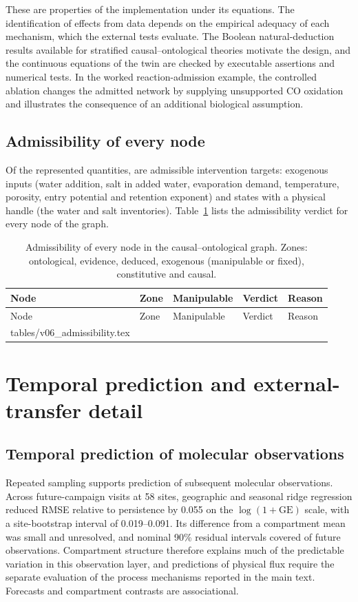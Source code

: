 \documentclass[11pt,a4paper]{article}
\makeatletter
\newcommand{\AdmissibilityRows}{\@@input tables/v06_admissibility.tex }
\makeatother
\begin{document}
These are properties of the implementation under its equations. The identification of effects from data depends on the empirical adequacy of each mechanism, which the external tests evaluate. The Boolean natural-deduction results available for stratified causal--ontological theories motivate the design, and the continuous equations of the twin are checked by executable assertions and numerical tests. In the worked reaction-admission example, the controlled ablation changes the admitted network by supplying unsupported CO oxidation and illustrates the consequence of an additional biological assumption.

\subsection{Admissibility of every node}
Of the \GraphNodes{} represented quantities, \AdmissibleNodes{} are admissible intervention targets: \AdmissibleInputs{} exogenous inputs (water addition, salt in added water, evaporation demand, temperature, porosity, entry potential and retention exponent) and \AdmissibleStates{} states with a physical handle (the water and salt inventories). Table~\ref{tab:admissibility} lists the admissibility verdict for every node of the graph.

{\small\setlength{\tabcolsep}{3pt}\begin{longtable}{@{}lp{2.8cm}lp{1.3cm}p{6.2cm}@{}}
\caption{Admissibility of every node in the causal--ontological graph. Zones: ontological, evidence, deduced, exogenous (manipulable or fixed), constitutive and causal.}\label{tab:admissibility}\\\toprule
Node & Zone & Manipulable & Verdict & Reason\\\midrule\endfirsthead
\toprule Node & Zone & Manipulable & Verdict & Reason\\\midrule\endhead
\AdmissibilityRows
\bottomrule
\end{longtable}}

\section{Temporal prediction and external-transfer detail}\label{sec:transfer}
\subsection{Temporal prediction of molecular observations}
Repeated sampling supports prediction of subsequent molecular observations. Across \TestVisits{} future-campaign visits at 58 sites, geographic and seasonal ridge regression reduced RMSE relative to persistence by 0.055 on the $\log(1+\mathrm{GE})$ scale, with a site-bootstrap interval of 0.019--0.091. Its difference from a compartment mean was small and unresolved, and nominal 90\% residual intervals covered \ConformalCoverage{} of future observations. Compartment structure therefore explains much of the predictable variation in this observation layer, and predictions of physical flux require the separate evaluation of the process mechanisms reported in the main text. Forecasts and compartment contrasts are associational.
\end{document}
